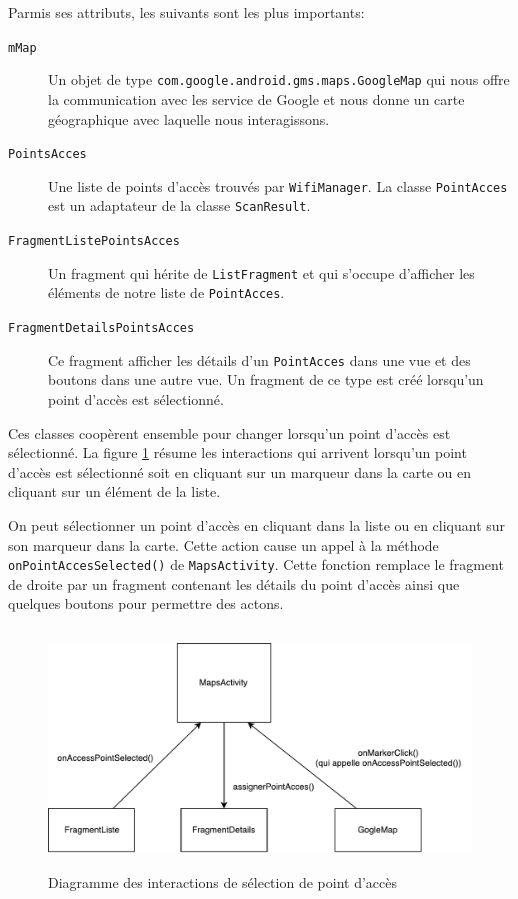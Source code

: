 \documentclass[12pt]{article}
\newcommand\code[1]{\texttt{#1}}
\begin{document}
	Parmis ses attributs, les suivants sont les plus importants:
	\begin{description}
		\item[\code{mMap}]

			Un objet de type \code{com.google.android.gms.maps.GoogleMap} qui
			nous offre la communication avec les service de Google et nous donne
			un carte géographique avec laquelle nous interagissons.

		\item[\code{PointsAcces}]

			Une liste de points d'accès trouvés par \code{WifiManager}.  La
			classe \code{PointAcces} est un adaptateur de la classe
			\code{ScanResult}.

		\item[\code{FragmentListePointsAcces}]

			Un fragment qui hérite de \code{ListFragment} et qui s'occupe
			d'afficher les éléments de notre liste de \code{PointAcces}.

		\item[\code{FragmentDetailsPointsAcces}]

			Ce fragment afficher les détails d'un \code{PointAcces} dans une
			vue et des boutons dans une autre vue.  Un fragment de ce type est
			créé lorsqu'un point d'accès est sélectionné.
	\end{description}

	Ces classes coopèrent ensemble pour changer lorsqu'un point d'accès est
	sélectionné.  La figure \ref{fig_interaction} résume les interactions qui
	arrivent lorsqu'un point d'accès est sélectionné soit en cliquant sur un
	marqueur dans la carte ou en cliquant sur un élément de la liste.

	On peut sélectionner un point d'accès en cliquant dans la liste ou en
	cliquant sur son marqueur dans la carte.  Cette action cause un appel à la
	méthode \code{onPointAccesSelected()} de \code{MapsActivity}.  Cette
	fonction remplace le fragment de droite par un fragment contenant les
	détails du point d'accès ainsi que quelques boutons pour permettre des
	actons.

	\begin{figure}[H]
		\centering
		\quad\includegraphics[height=2.5in]{communication_diag.pdf}
		\parbox[t]{4in}{\caption{Diagramme des interactions de sélection de point d'accès}\label{fig_interaction}}
	\end{figure}
\end{document}
